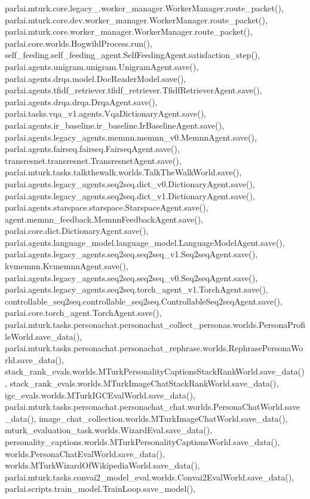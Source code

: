 parlai.\+mturk.\+core.\+legacy\+\_.\+worker\+\_\+manager.\+Worker\+Manager.\+route\+\_\+packet(), parlai.\+mturk.\+core.\+dev.\+worker\+\_\+manager.\+Worker\+Manager.\+route\+\_\+packet(), parlai.\+mturk.\+core.\+worker\+\_\+manager.\+Worker\+Manager.\+route\+\_\+packet(), parlai.\+core.\+worlds.\+Hogwild\+Process.\+run(), self\+\_\+feeding.\+self\+\_\+feeding\+\_\+agent.\+Self\+Feeding\+Agent.\+satisfaction\+\_\+step(), parlai.\+agents.\+unigram.\+unigram.\+Unigram\+Agent.\+save(), parlai.\+agents.\+drqa.\+model.\+Doc\+Reader\+Model.\+save(), parlai.\+agents.\+tfidf\+\_\+retriever.\+tfidf\+\_\+retriever.\+Tfidf\+Retriever\+Agent.\+save(), parlai.\+agents.\+drqa.\+drqa.\+Drqa\+Agent.\+save(), parlai.\+tasks.\+vqa\+\_\+v1.\+agents.\+Vqa\+Dictionary\+Agent.\+save(), parlai.\+agents.\+ir\+\_\+baseline.\+ir\+\_\+baseline.\+Ir\+Baseline\+Agent.\+save(), parlai.\+agents.\+legacy\+\_\+agents.\+memnn.\+memnn\+\_\+v0.\+Memnn\+Agent.\+save(), parlai.\+agents.\+fairseq.\+fairseq.\+Fairseq\+Agent.\+save(), transresnet.\+transresnet.\+Transresnet\+Agent.\+save(), parlai.\+mturk.\+tasks.\+talkthewalk.\+worlds.\+Talk\+The\+Walk\+World.\+save(), parlai.\+agents.\+legacy\+\_\+agents.\+seq2seq.\+dict\+\_\+v0.\+Dictionary\+Agent.\+save(), parlai.\+agents.\+legacy\+\_\+agents.\+seq2seq.\+dict\+\_\+v1.\+Dictionary\+Agent.\+save(), parlai.\+agents.\+starspace.\+starspace.\+Starspace\+Agent.\+save(), agent.\+memnn\+\_\+feedback.\+Memnn\+Feedback\+Agent.\+save(), parlai.\+core.\+dict.\+Dictionary\+Agent.\+save(), parlai.\+agents.\+language\+\_\+model.\+language\+\_\+model.\+Language\+Model\+Agent.\+save(), parlai.\+agents.\+legacy\+\_\+agents.\+seq2seq.\+seq2seq\+\_\+v1.\+Seq2seq\+Agent.\+save(), kvmemnn.\+Kvmemnn\+Agent.\+save(), parlai.\+agents.\+legacy\+\_\+agents.\+seq2seq.\+seq2seq\+\_\+v0.\+Seq2seq\+Agent.\+save(), parlai.\+agents.\+legacy\+\_\+agents.\+seq2seq.\+torch\+\_\+agent\+\_\+v1.\+Torch\+Agent.\+save(), controllable\+\_\+seq2seq.\+controllable\+\_\+seq2seq.\+Controllable\+Seq2seq\+Agent.\+save(), parlai.\+core.\+torch\+\_\+agent.\+Torch\+Agent.\+save(), parlai.\+mturk.\+tasks.\+personachat.\+personachat\+\_\+collect\+\_\+personas.\+worlds.\+Persona\+Profile\+World.\+save\+\_\+data(), parlai.\+mturk.\+tasks.\+personachat.\+personachat\+\_\+rephrase.\+worlds.\+Rephrase\+Persona\+World.\+save\+\_\+data(), stack\+\_\+rank\+\_\+evals.\+worlds.\+M\+Turk\+Personality\+Captions\+Stack\+Rank\+World.\+save\+\_\+data(), stack\+\_\+rank\+\_\+evals.\+worlds.\+M\+Turk\+Image\+Chat\+Stack\+Rank\+World.\+save\+\_\+data(), igc\+\_\+evals.\+worlds.\+M\+Turk\+I\+G\+C\+Eval\+World.\+save\+\_\+data(), parlai.\+mturk.\+tasks.\+personachat.\+personachat\+\_\+chat.\+worlds.\+Persona\+Chat\+World.\+save\+\_\+data(), image\+\_\+chat\+\_\+collection.\+worlds.\+M\+Turk\+Image\+Chat\+World.\+save\+\_\+data(), mturk\+\_\+evaluation\+\_\+task.\+worlds.\+Wizard\+Eval.\+save\+\_\+data(), personality\+\_\+captions.\+worlds.\+M\+Turk\+Personality\+Captions\+World.\+save\+\_\+data(), worlds.\+Persona\+Chat\+Eval\+World.\+save\+\_\+data(), worlds.\+M\+Turk\+Wizard\+Of\+Wikipedia\+World.\+save\+\_\+data(), parlai.\+mturk.\+tasks.\+convai2\+\_\+model\+\_\+eval.\+worlds.\+Convai2\+Eval\+World.\+save\+\_\+data(), parlai.\+scripts.\+train\+\_\+model.\+Train\+Loop.\+save\+\_\+model(), 